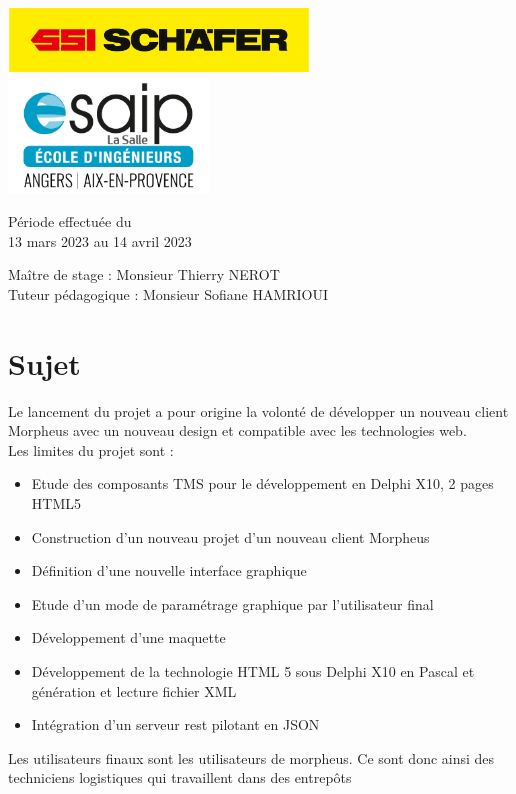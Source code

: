 \documentclass[a4paper, 12pt, french]{article}
\newcommand{\bdot}{\item[\color{ssiYellow}\ding{108}]}
\begin{document}
\begin{titlepage}
\begin{center}
			\vfill

			\includegraphics[width=0.6\textwidth]{../images/schaefer.jpg}
			\vfill
			\includegraphics[width=0.4\textwidth]{../images/esaip.jpg}

			\vfill

			Période effectuée du\\
			13 mars 2023 au 14 avril 2023

			\vspace{0.8cm}
			
			\Large
			Maître de stage : Monsieur Thierry NEROT\\
			Tuteur pédagogique : Monsieur Sofiane HAMRIOUI\\
		\end{center}
	\end{titlepage}
		
	\newpage
	
	\doublespacing
	\tableofcontents

	\newpage
		
	
	
	
	\singlespacing

	\section{Sujet}
		Le lancement du projet a pour origine la volonté de développer un nouveau client Morpheus avec un nouveau design et compatible avec les technologies web.\\

		\noindent Les limites du projet sont :

		\begin{itemize}
			\bdot{Etude des composants TMS pour le développement en Delphi X10, 2 pages HTML5}
			\bdot{Construction d’un nouveau projet d’un nouveau client Morpheus}
			\bdot{Définition d’une nouvelle interface graphique}
			\bdot{Etude d’un mode de paramétrage graphique par l’utilisateur final}
			\bdot{Développement d’une maquette}
			\bdot{Développement de la technologie HTML 5 sous Delphi X10 en Pascal et génération et lecture fichier XML}
			\bdot{Intégration d’un serveur rest pilotant en JSON}
		\end{itemize}
		\vspace{\baselineskip}
		\par Les utilisateurs finaux sont les utilisateurs de morpheus. Ce sont donc ainsi des techniciens logistiques qui travaillent dans des entrepôts
\end{document}
